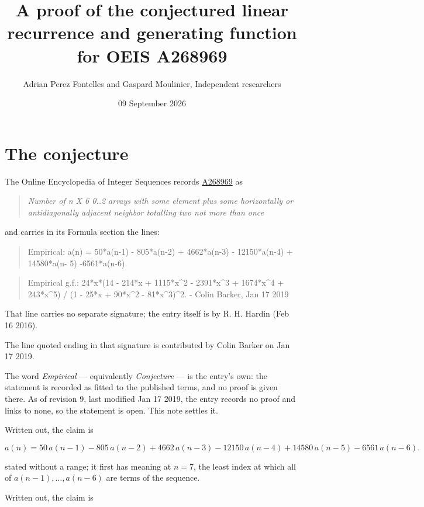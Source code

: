 \documentclass[11pt]{article}
\title{A proof of the conjectured linear recurrence and generating function for OEIS A268969}
\author{Adrian Perez Fontelles and Gaspard Moulinier, Independent researchers}
\date{09 September 2026}
\theoremstyle{definition}
\begin{document}
\maketitle
\section{The conjecture}

The Online Encyclopedia of Integer Sequences records \href{https://oeis.org/A268969}{A268969} as

\begin{quote}\itshape Number of n X 6 0..2 arrays with some element plus some horizontally or antidiagonally adjacent neighbor totalling two not more than once\end{quote}

and carries in its Formula section the lines:

\begin{quote}\ttfamily Empirical: a(n) = 50*a(n-1) - 805*a(n-2) + 4662*a(n-3) - 12150*a(n-4) + 14580*a(n- 5) -6561*a(n-6).\end{quote}

\begin{quote}\ttfamily Empirical g.f.: 24*x*(14 - 214*x + 1115*x\textasciicircum{}2 - 2391*x\textasciicircum{}3 + 1674*x\textasciicircum{}4 + 243*x\textasciicircum{}5) / (1 - 25*x + 90*x\textasciicircum{}2 - 81*x\textasciicircum{}3)\textasciicircum{}2. - Colin Barker, Jan 17 2019\end{quote}

That line carries no separate signature; the entry itself is by R. H. Hardin (Feb 16 2016).

The line quoted ending in that signature is contributed by Colin Barker on Jan 17 2019.

The word {\itshape Empirical} --- equivalently {\itshape Conjecture} --- is the entry's own: the statement is recorded as fitted to the published terms, and no proof is given there. As of revision 9, last modified Jan 17 2019, the entry records no proof and links to none, so the statement is open. This note settles it.

Written out, the claim is

\[a(n) = 50\,a(n-1) - 805\,a(n-2) + 4662\,a(n-3) - 12150\,a(n-4) + 14580\,a(n-5) - 6561\,a(n-6).\]

stated without a range; it first has meaning at $n = 7$, the least index at which all of $a(n-1),\dots,a(n-6)$ are terms of the sequence.

Written out, the claim is
\end{document}
